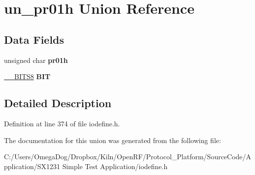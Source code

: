 \hypertarget{unionun__pr01h}{\section{un\-\_\-pr01h Union Reference}
\label{unionun__pr01h}
}
\subsection*{Data Fields}
\begin{DoxyCompactItemize}
\item 
\hypertarget{unionun__pr01h_adcc3b3ceba2ffb1e0d1402e249276b9d}{unsigned char {\bfseries pr01h}}\label{unionun__pr01h_adcc3b3ceba2ffb1e0d1402e249276b9d}

\item 
\hypertarget{unionun__pr01h_ad42014b55f951012c1fbc74abdb06657}{\hyperlink{struct_____b_i_t_s8}{\-\_\-\-\_\-\-B\-I\-T\-S8} {\bfseries B\-I\-T}}\label{unionun__pr01h_ad42014b55f951012c1fbc74abdb06657}

\end{DoxyCompactItemize}


\subsection{Detailed Description}


Definition at line 374 of file iodefine.\-h.



The documentation for this union was generated from the following file\-:\begin{DoxyCompactItemize}
\item 
C\-:/\-Users/\-Omega\-Dog/\-Dropbox/\-Kiln/\-Open\-R\-F/\-Protocol\-\_\-\-Platform/\-Source\-Code/\-Application/\-S\-X1231 Simple Test Application/iodefine.\-h\end{DoxyCompactItemize}
